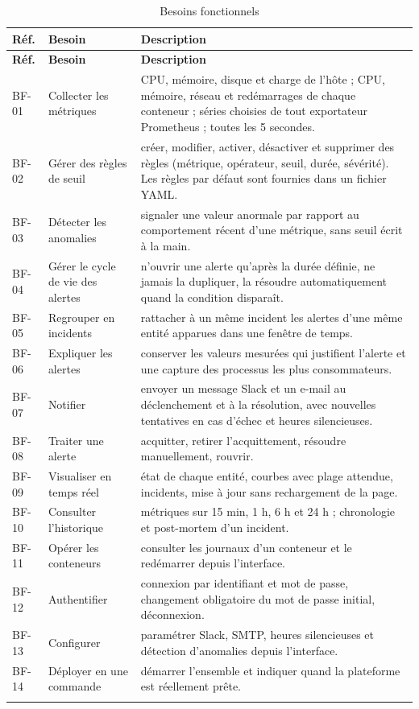\begin{longtable}{L{1.2cm}L{4.2cm}p{8.6cm}}
\toprule
\textbf{Réf.} & \textbf{Besoin} & \textbf{Description} \\
\midrule
\endfirsthead
\toprule
\textbf{Réf.} & \textbf{Besoin} & \textbf{Description} \\
\midrule
\endhead
BF-01 & Collecter les métriques & CPU, mémoire, disque et charge de l'hôte ; CPU, mémoire, réseau et redémarrages de chaque conteneur ; séries choisies de tout exportateur Prometheus ; toutes les 5 secondes. \\
BF-02 & Gérer des règles de seuil & créer, modifier, activer, désactiver et supprimer des règles (métrique, opérateur, seuil, durée, sévérité). Les règles par défaut sont fournies dans un fichier YAML. \\
BF-03 & Détecter les anomalies & signaler une valeur anormale par rapport au comportement récent d'une métrique, sans seuil écrit à la main. \\
BF-04 & Gérer le cycle de vie des alertes & n'ouvrir une alerte qu'après la durée définie, ne jamais la dupliquer, la résoudre automatiquement quand la condition disparaît. \\
BF-05 & Regrouper en incidents & rattacher à un même incident les alertes d'une même entité apparues dans une fenêtre de temps. \\
BF-06 & Expliquer les alertes & conserver les valeurs mesurées qui justifient l'alerte et une capture des processus les plus consommateurs. \\
BF-07 & Notifier & envoyer un message Slack et un e-mail au déclenchement et à la résolution, avec nouvelles tentatives en cas d'échec et heures silencieuses. \\
BF-08 & Traiter une alerte & acquitter, retirer l'acquittement, résoudre manuellement, rouvrir. \\
BF-09 & Visualiser en temps réel & état de chaque entité, courbes avec plage attendue, incidents, mise à jour sans rechargement de la page. \\
BF-10 & Consulter l'historique & métriques sur 15 min, 1 h, 6 h et 24 h ; chronologie et post-mortem d'un incident. \\
BF-11 & Opérer les conteneurs & consulter les journaux d'un conteneur et le redémarrer depuis l'interface. \\
BF-12 & Authentifier & connexion par identifiant et mot de passe, changement obligatoire du mot de passe initial, déconnexion. \\
BF-13 & Configurer & paramétrer Slack, SMTP, heures silencieuses et détection d'anomalies depuis l'interface. \\
BF-14 & Déployer en une commande & démarrer l'ensemble et indiquer quand la plateforme est réellement prête. \\
\bottomrule
\caption{Besoins fonctionnels}
\label{tab:bf}
\end{longtable}

